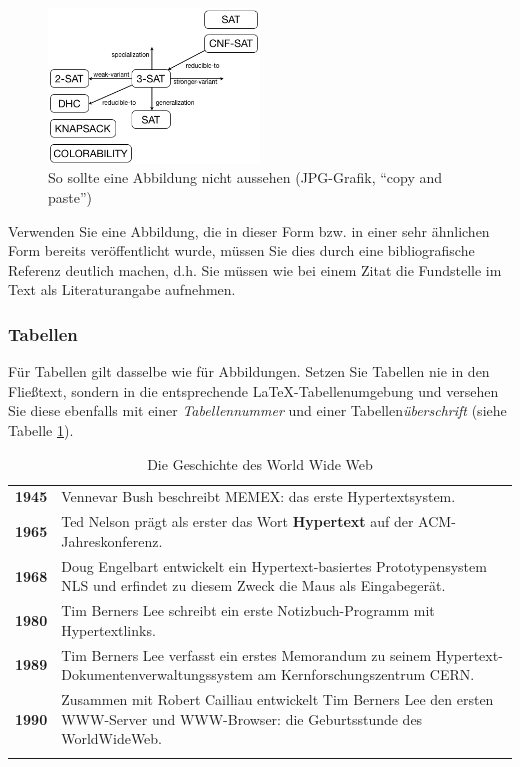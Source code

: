 \begin{figure}[ht]
  \begin{center}\includegraphics[width=0.5\textwidth]{images/3sat.png}\end{center}
  \caption{So sollte eine Abbildung nicht aussehen (JPG-Grafik, "`copy and paste"')}
  \label{fig_Abb2}
\end{figure} 
Verwenden Sie eine Abbildung, die in dieser Form bzw. in einer sehr ähnlichen Form bereits veröffentlicht wurde, müssen Sie dies durch eine bibliografische Referenz deutlich machen, d.h. Sie müssen wie bei einem Zitat die Fundstelle im Text als Literaturangabe aufnehmen.



\subsubsection{Tabellen}
Für Tabellen gilt dasselbe wie für Abbildungen.
Setzen Sie Tabellen nie in den Fließtext, sondern in die entsprechende \LaTeX-Tabellenumgebung und versehen Sie diese ebenfalls mit einer {\em Tabellennummer} und einer Tabellen{\em überschrift} (siehe Tabelle \ref{tab_HistoryWWW}).

\begin{table}
\caption{Die Geschichte des World Wide Web}
\begin{tabular}{rp{12cm}} \noalign{\smallskip} \hline \noalign{\smallskip}
{\bf 1945} & Vennevar Bush beschreibt MEMEX: das erste Hypertextsystem.\\
{\bf 1965} & Ted Nelson prägt als erster das Wort {\bf Hypertext} auf der ACM-Jahreskonferenz.\\ 
{\bf 1968} & Doug Engelbart entwickelt ein Hypertext-basiertes Prototypensystem NLS und erfindet zu diesem Zweck die Maus als Eingabegerät.\\
{\bf 1980} & Tim Berners Lee schreibt ein erste Notizbuch-Programm mit Hypertextlinks.\\
{\bf 1989} & Tim Berners Lee verfasst ein erstes Memorandum zu seinem Hypertext-Dokumentenverwaltungssystem am Kernforschungszentrum CERN.\\
{\bf 1990} & Zusammen mit Robert Cailliau entwickelt Tim Berners Lee den ersten WWW-Server und WWW-Browser: die Geburtsstunde des WorldWideWeb.\\  \noalign{\smallskip} \hline
\end{tabular}
\label{tab_HistoryWWW}
\end{table}  


